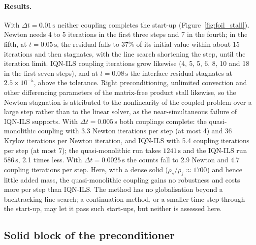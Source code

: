 \paragraph{Results.}
With $\Delta t = 0.01\,\mathrm{s}$ neither coupling completes the start-up (Figure~\ref{fig:foil_stall}).
Newton needs 4 to 5 iterations in the first three steps and 7 in the fourth; in the fifth, at $t = 0.05\,\mathrm{s}$, the residual falls to $37\%$ of its initial value within about 15 iterations and then stagnates, with the line search shortening the step, until the iteration limit.
IQN-ILS coupling iterations grow likewise (4, 5, 5, 6, 8, 10 and 18 in the first seven steps), and at $t = 0.08\,\mathrm{s}$ the interface residual stagnates at $2.5\times10^{-5}$, above the tolerance.
Right preconditioning, unlimited convection and other differencing parameters of the matrix-free product stall likewise, so the Newton stagnation is attributed to the nonlinearity of the coupled problem over a large step rather than to the linear solver, as the near-simultaneous failure of IQN-ILS supports.
With $\Delta t = 0.005\,\mathrm{s}$ both couplings complete: the quasi-monolithic coupling with 3.3 Newton iterations per step (at most 4) and 36 Krylov iterations per Newton iteration, and IQN-ILS with 5.4 coupling iterations per step (at most 7); the quasi-monolithic run takes $1241\,\mathrm{s}$ and the IQN-ILS run $586\,\mathrm{s}$, 2.1 times less.
With $\Delta t = 0.0025\,\mathrm{s}$ the counts fall to 2.9 Newton and 4.7 coupling iterations per step.
Here, with a dense solid ($\rho_s/\rho_f \approx 1700$) and hence little added mass, the quasi-monolithic coupling gains no robustness and costs more per step than IQN-ILS.
The method has no globalisation beyond a backtracking line search; a continuation method, or a smaller time step through the start-up, may let it pass such start-ups, but neither is assessed here.

\subsection{Solid block of the preconditioner}\label{sec:lim_solid_pc}

